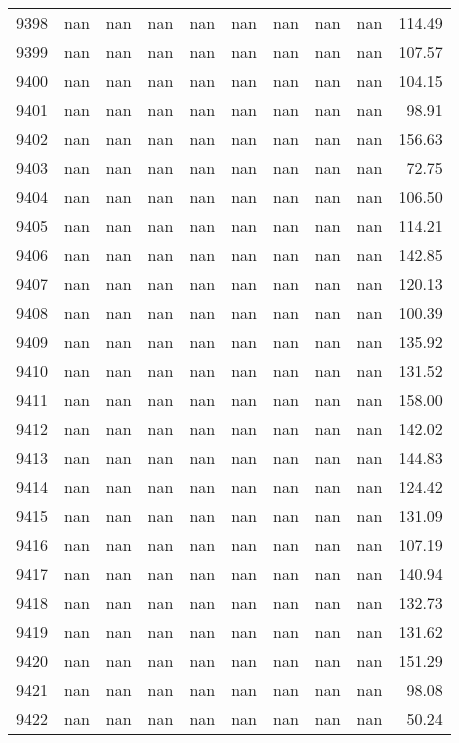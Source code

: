 \begin{tabular}{lrrrrrrrrr}
9398 & nan & nan & nan & nan & nan & nan & nan & nan & 114.49 \\
9399 & nan & nan & nan & nan & nan & nan & nan & nan & 107.57 \\
9400 & nan & nan & nan & nan & nan & nan & nan & nan & 104.15 \\
9401 & nan & nan & nan & nan & nan & nan & nan & nan & 98.91 \\
9402 & nan & nan & nan & nan & nan & nan & nan & nan & 156.63 \\
9403 & nan & nan & nan & nan & nan & nan & nan & nan & 72.75 \\
9404 & nan & nan & nan & nan & nan & nan & nan & nan & 106.50 \\
9405 & nan & nan & nan & nan & nan & nan & nan & nan & 114.21 \\
9406 & nan & nan & nan & nan & nan & nan & nan & nan & 142.85 \\
9407 & nan & nan & nan & nan & nan & nan & nan & nan & 120.13 \\
9408 & nan & nan & nan & nan & nan & nan & nan & nan & 100.39 \\
9409 & nan & nan & nan & nan & nan & nan & nan & nan & 135.92 \\
9410 & nan & nan & nan & nan & nan & nan & nan & nan & 131.52 \\
9411 & nan & nan & nan & nan & nan & nan & nan & nan & 158.00 \\
9412 & nan & nan & nan & nan & nan & nan & nan & nan & 142.02 \\
9413 & nan & nan & nan & nan & nan & nan & nan & nan & 144.83 \\
9414 & nan & nan & nan & nan & nan & nan & nan & nan & 124.42 \\
9415 & nan & nan & nan & nan & nan & nan & nan & nan & 131.09 \\
9416 & nan & nan & nan & nan & nan & nan & nan & nan & 107.19 \\
9417 & nan & nan & nan & nan & nan & nan & nan & nan & 140.94 \\
9418 & nan & nan & nan & nan & nan & nan & nan & nan & 132.73 \\
9419 & nan & nan & nan & nan & nan & nan & nan & nan & 131.62 \\
9420 & nan & nan & nan & nan & nan & nan & nan & nan & 151.29 \\
9421 & nan & nan & nan & nan & nan & nan & nan & nan & 98.08 \\
9422 & nan & nan & nan & nan & nan & nan & nan & nan & 50.24 \\

\end{tabular}
